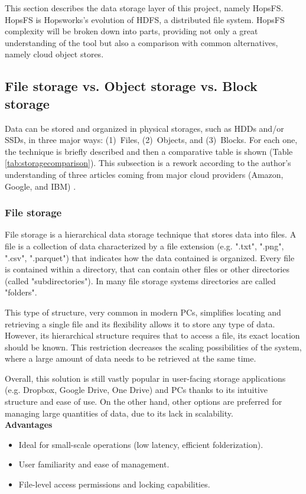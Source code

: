 This section describes the data storage layer of this project, namely \gls{HopsFS}. \gls{HopsFS} is Hopsworks's evolution of \gls{HDFS}, a distributed file system. \gls{HopsFS} complexity will be broken down into parts, providing not only a great understanding of the tool but also a comparison with common alternatives, namely cloud object stores.

\subsection{File storage vs. Object storage vs. Block storage}
\label{subsec:file_vs_obj_vs_block}

Data can be stored and organized in physical storages, such as \glspl{HDD} and/or \glspl{SSD}, in three major ways: (1)~Files, (2)~Objects, and (3)~Blocks. For each one, the technique is briefly described and then a comparative table is shown (Table \ref{tab:storagecomparison}). This subsection is a rework according to the author's understanding of three articles coming from major cloud providers (Amazon, Google, and IBM) \cite{BlockVsFile, HowObjectVs, ObjectVsFile2021}.

\subsubsection*{File storage}

File storage is a hierarchical data storage technique that stores data into files. A file is a collection of data characterized by a file extension (e.g. ".txt", ".png", ".csv", ".parquet") that indicates how the data contained is organized. Every file is contained within a directory, that can contain other files or other directories (called "subdirectories"). In many file storage systems directories are called "folders". 

This type of structure, very common in modern \glspl{PC}, simplifies locating and retrieving a single file and its flexibility allows it to store any type of data. However, its hierarchical structure requires that to access a file, its exact location should be known. This restriction decreases the scaling possibilities of the system, where a large amount of data needs to be retrieved at the same time.

Overall, this solution is still vastly popular in user-facing storage applications (e.g. Dropbox, Google Drive, One Drive) and \glspl{PC} thanks to its intuitive structure and ease of use. On the other hand, other options are preferred for managing large quantities of data, due to its lack in scalability. \\[3mm]
\noindent\textbf{Advantages}
\begin{itemize}
    \item Ideal for small-scale operations (low latency, efficient folderization).
    \item User familiarity and ease of management.
    \item File-level access permissions and locking capabilities.
\end{itemize}

